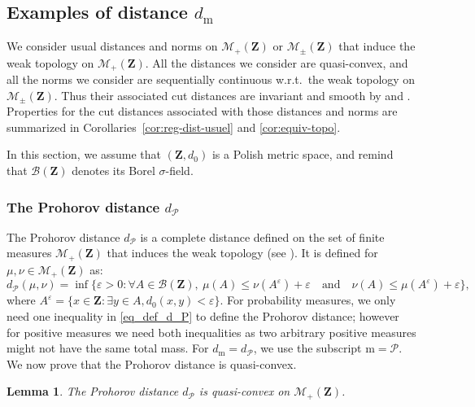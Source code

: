 \documentclass{amsart}
\newcommand{\wrt}{w.r.t.\ }
\theoremstyle{plain}
\newtheorem{lemme}[Th]{Lemma}
\theoremstyle{definition}
\newcommand{\Space}{\mathbf{Z}}
\newcommand{\Borel}{\mathcal{B}(\Space)}
\newcommand{\dspace}{d_0}
\newcommand{\Meas}{\mathcal{M}_+(\Space)}
\newcommand{\SignedMeas}{\mathcal{M}_{\pm}(\Space)}
\newcommand{\m}{\mathrm{m}}
\newcommand{\dmeas}{d_\m}
\newcommand{\dmeasP}{d_{\mathcal{P}}}
\newcommand{\eps}{\varepsilon}
\begin{document}
\subsection{Examples of distance \texorpdfstring{$\dmeas$}{}}
\label{section_examples_distance}

We consider usual distances and norms on $\Meas$ or $\SignedMeas$ that
induce the weak topology on $\Meas$. 
All the distances we consider are quasi-convex,
and all the norms we consider are sequentially continuous \wrt the weak topology on $\SignedMeas$.
Thus their associated cut distances are invariant and smooth 
	by  and .
Properties for the cut distances associated with those distances and norms
	are summarized in Corollaries~\ref{cor:reg-dist-usuel} and
	\ref{cor:equiv-topo}.

In this section, we assume that $(\Space, \dspace)$ is a Polish metric
space, and remind that $\Borel$ denotes its Borel $\sigma$-field. 

\subsubsection{The Prohorov distance \texorpdfstring{$\dmeasP$}{}}

The Prohorov distance $\dmeasP$ is a complete distance defined on the
set of finite  measures $\Meas$ 
that induces the weak topology (see \cite[Theorem 6.8]{Billingsley}). 
It is defined for $\mu, \nu\in \Meas$ as:
\begin{equation}\label{eq_def_d_P}
\dmeasP(\mu,\nu) = \inf\{ \eps > 0 : \forall A\in \mathcal{B}(\Space),\ 
\mu(A) \leq \nu(A^\eps) + \eps 
\quad\text{and}\quad
\nu(A) \leq \mu(A^\eps) + \eps 		\} ,
\end{equation}
where $A^\eps = \{ x\in\Space : \exists y\in A, \dspace(x,y) < \eps \}$.
For probability measures, we only need one inequality in \eqref{eq_def_d_P}
to define the Prohorov distance; however for positive measures
we need both inequalities as two arbitrary positive measures might not have the same total mass.
For $\dmeas=\dmeasP$, we use the subscript $\m= \mathcal{P}$.
We now prove that  the Prohorov distance is quasi-convex.

\begin{lemme}
The Prohorov distance $\dmeasP$ is quasi-convex on $\Meas$.
\end{lemme}
\end{document}
